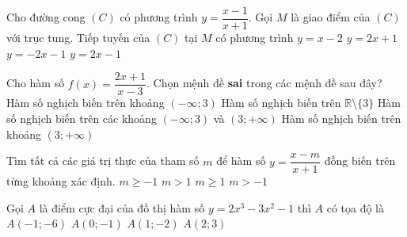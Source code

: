 \begin{ex}%
	Cho đường cong $\left(C\right)$ có phương trình $y = \dfrac{x - 1}{x + 1}$. Gọi $M$ là giao điểm của $\left(C\right)$ với trục tung. Tiếp tuyến của $\left(C\right)$ tại $M$ có phương trình
	\choice
	{$y = x - 2$}
	{$y = 2x + 1$}
	{$y = -2x - 1$}
	{\True $y = 2x - 1$}
\end{ex}
\begin{ex}%
	Cho hàm số $f(x)=\dfrac{2 x+1}{x-3}$. Chọn mệnh đề \textbf{sai} trong các mệnh đề sau đây?
	\choice
	{Hàm số nghịch biến trên khoảng $(-\infty ; 3)$}
	{\True Hàm số nghịch biến trên $\mathbb{R} \setminus \{3\}$}
	{Hàm số nghịch biến trên các khoảng $(-\infty ; 3)$ và $(3 ;+\infty)$}
	{Hàm số nghịch biến trên khoảng $(3 ;+\infty)$}
\end{ex}
\begin{ex}%
	Tìm tất cả các giá trị thực của tham số $m$ để hàm số $y = \dfrac{x - m}{x + 1}$ đồng biến trên từng khoảng xác định.
	\choice
	{$m\ge -1$}
	{$m > 1$}
	{$m\ge 1$}
	{\True $m > -1$}
\end{ex}
\begin{ex}%
	Gọi $A$ là điểm cực đại của đồ thị hàm số $y = 2x^3 - 3x^2 - 1$ thì $A$ có tọa độ là
	\choice
	{$A\left(-1;-6\right)$}
	{\True $A\left(0;-1\right)$}
	{$A\left(1;-2\right)$}
	{$A\left(2;3\right)$}
\end{ex}
